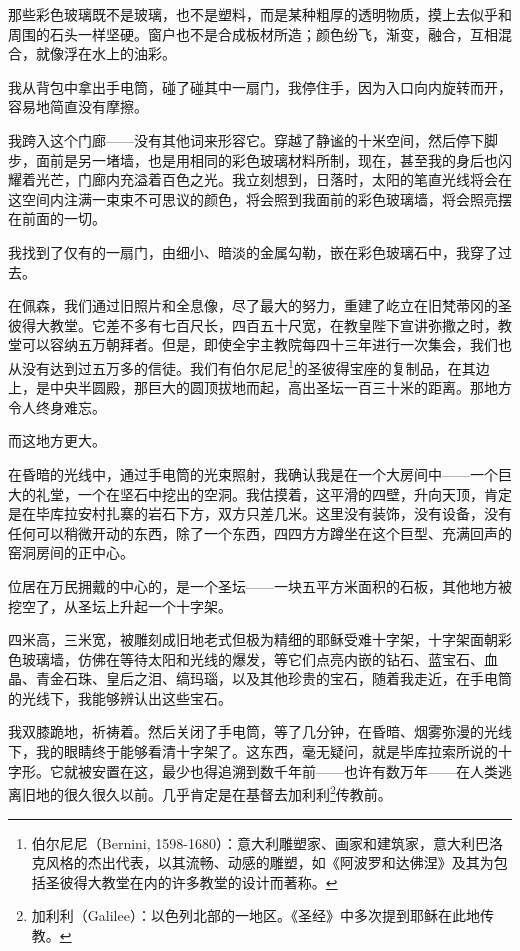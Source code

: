 \documentclass[AutoFakeBold=true]{book}
\begin{document}
那些彩色玻璃既不是玻璃，也不是塑料，而是某种粗厚的透明物质，摸上去似乎和周围的石头一样坚硬。窗户也不是合成板材所造；颜色纷飞，渐变，融合，互相混合，就像浮在水上的油彩。

我从背包中拿出手电筒，碰了碰其中一扇门，我停住手，因为入口向内旋转而开，容易地简直没有摩擦。

我跨入这个门廊——没有其他词来形容它。穿越了静谧的十米空间，然后停下脚步，面前是另一堵墙，也是用相同的彩色玻璃材料所制，现在，甚至我的身后也闪耀着光芒，门廊内充溢着百色之光。我立刻想到，日落时，太阳的笔直光线将会在这空间内注满一束束不可思议的颜色，将会照到我面前的彩色玻璃墙，将会照亮摆在前面的一切。

我找到了仅有的一扇门，由细小、暗淡的金属勾勒，嵌在彩色玻璃石中，我穿了过去。

在佩森，我们通过旧照片和全息像，尽了最大的努力，重建了屹立在旧梵蒂冈的圣彼得大教堂。它差不多有七百尺长，四百五十尺宽，在教皇陛下宣讲弥撒之时，教堂可以容纳五万朝拜者。但是，即使全宇主教院每四十三年进行一次集会，我们也从没有达到过五万多的信徒。我们有伯尔尼尼\footnote{伯尔尼尼（Bernini, 1598-1680）：意大利雕塑家、画家和建筑家，意大利巴洛克风格的杰出代表，以其流畅、动感的雕塑，如《阿波罗和达佛涅》及其为包括圣彼得大教堂在内的许多教堂的设计而著称。}的圣彼得宝座的复制品，在其边上，是中央半圆殿，那巨大的圆顶拔地而起，高出圣坛一百三十米的距离。那地方令人终身难忘。

而这地方更大。

在昏暗的光线中，通过手电筒的光束照射，我确认我是在一个大房间中——一个巨大的礼堂，一个在坚石中挖出的空洞。我估摸着，这平滑的四壁，升向天顶，肯定是在毕库拉安村扎寨的岩石下方，双方只差几米。这里没有装饰，没有设备，没有任何可以稍微开动的东西，除了一个东西，四四方方蹲坐在这个巨型、充满回声的窑洞房间的正中心。

位居在万民拥戴的中心的，是一个圣坛——一块五平方米面积的石板，其他地方被挖空了，从圣坛上升起一个十字架。

四米高，三米宽，被雕刻成旧地老式但极为精细的耶稣受难十字架，十字架面朝彩色玻璃墙，仿佛在等待太阳和光线的爆发，等它们点亮内嵌的钻石、蓝宝石、血晶、青金石珠、皇后之泪、缟玛瑙，以及其他珍贵的宝石，随着我走近，在手电筒的光线下，我能够辨认出这些宝石。

我双膝跪地，祈祷着。然后关闭了手电筒，等了几分钟，在昏暗、烟雾弥漫的光线下，我的眼睛终于能够看清十字架了。这东西，毫无疑问，就是毕库拉索所说的十字形。它就被安置在这，最少也得追溯到数千年前——也许有数万年——在人类逃离旧地的很久很久以前。几乎肯定是在基督去加利利\footnote{加利利（Galilee）：以色列北部的一地区。《圣经》中多次提到耶稣在此地传教。}传教前。
\end{document}
